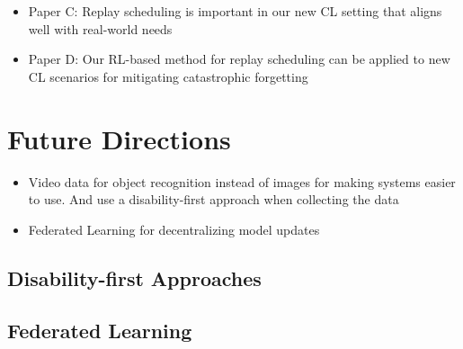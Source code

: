 \begin{itemize}
	\item Paper C: Replay scheduling is important in our new CL setting that aligns well with real-world needs
	\item Paper D: Our RL-based method for replay scheduling can be applied to new CL scenarios for mitigating catastrophic forgetting
\end{itemize}



\section{Future Directions}\label{chap5:sec:future_directions}

\begin{itemize}
	\item Video data for object recognition instead of images for making systems easier to use. And use a disability-first approach when collecting the data
	\item Federated Learning for decentralizing model updates 
\end{itemize}


\subsection{Disability-first Approaches}


\subsection{Federated Learning}